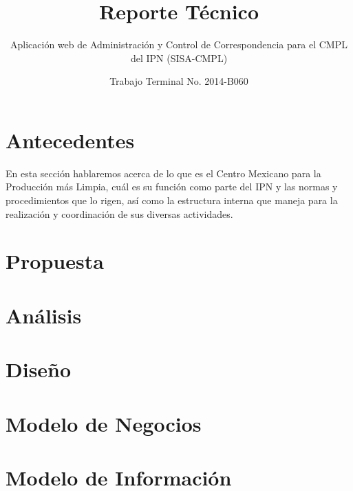 \documentclass[oneside,10pt]{book}
\title{Reporte Técnico}
\subtitle{Aplicación web de Administración y Control de Correspondencia para el CMPL del IPN (SISA-CMPL)}
\author{Trabajo Terminal No. 2014-B060}
\begin{document}
\maketitle
\thispagestyle{empty}

\frontmatter
\tableofcontents

\mainmatter

\chapter{Antecedentes}
	En esta sección hablaremos acerca de lo que es el Centro Mexicano para la Producción más Limpia, cuál es su función como parte del IPN y las normas y procedimientos que lo rigen, así como la estructura interna que maneja para la realización y coordinación de sus diversas actividades.
	

\chapter{Propuesta}


\chapter{Análisis}


\chapter{Diseño}



\chapter{Modelo de Negocios}




\chapter{Modelo de Información}
\end{document}
